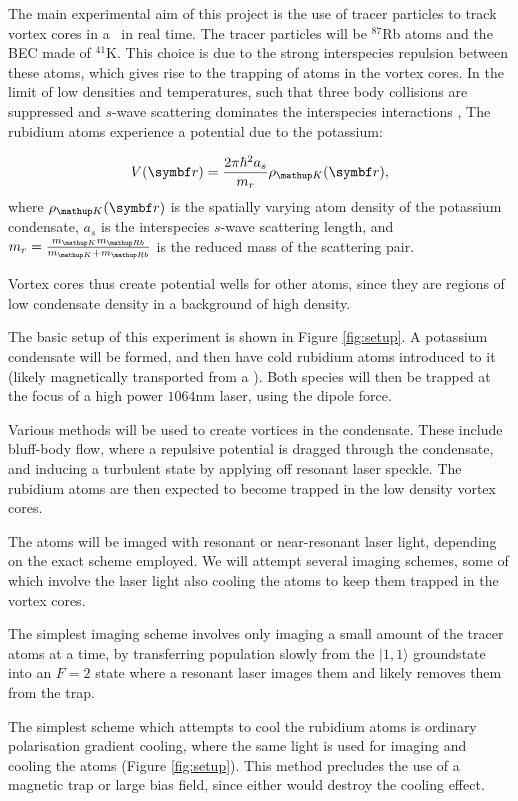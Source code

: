 The main experimental aim of this project is the use of tracer particles to track vortex cores in a \bec\ in real time. The tracer particles will be $^{87}$Rb atoms and the BEC made of $^{41}$K. This choice is due to the strong interspecies repulsion between these atoms, which gives rise to the trapping of atoms in the vortex cores. In the limit of low densities and temperatures, such that three body collisions are suppressed and $s$-wave scattering dominates the interspecies interactions \cite[p 120]{leggett_quantum_2006}, The rubidium atoms experience a potential due to the potassium:

\begin{equation}
V(\vec{r}) = \frac{2\pi\hbar^2 a_s}{m_r}\rho_\up{K}(\vec{r}),
\end{equation}
where $\rho_\up{K}(\vec{r})$ is the spatially varying atom density of the potassium condensate, $a_s$ is the interspecies $s$-wave scattering length, and
$m_r = \frac{m_\up{K}m_\up{Rb}}{m_\up{K} + m_\up{Rb}}$ is the reduced mass of the scattering pair.

Vortex cores thus create potential wells for other atoms, since they are regions of low condensate density in a background of high density.

The basic setup of this experiment is shown in Figure \ref{fig:setup}. A potassium condensate will be formed, and then have cold rubidium atoms introduced to it (likely magnetically transported from a \mot). Both species will then be trapped at the focus of a high power $1064$nm laser, using the dipole force.

Various methods will be used to create vortices in the condensate. These include bluff-body flow, where a repulsive potential is dragged through the condensate, and inducing a turbulent state by applying off resonant laser speckle. The rubidium atoms are then expected to become trapped in the low density vortex cores.

The atoms will be imaged with resonant or near-resonant laser light, depending on the exact scheme employed. We will attempt several imaging schemes, some of which involve the laser light also cooling the atoms to keep them trapped in the vortex cores.

The simplest imaging scheme involves only imaging a small amount of the tracer atoms at a time, by transferring population slowly from the $|1,1\rangle$ groundstate into an $F=2$ state where a resonant laser images them and likely removes them from the trap.

The simplest scheme which attempts to cool the rubidium atoms is ordinary polarisation gradient cooling, where the same light is used for imaging and cooling the atoms (Figure \ref{fig:setup}). This method precludes the use of a magnetic trap or large bias field, since either would destroy the cooling effect.


